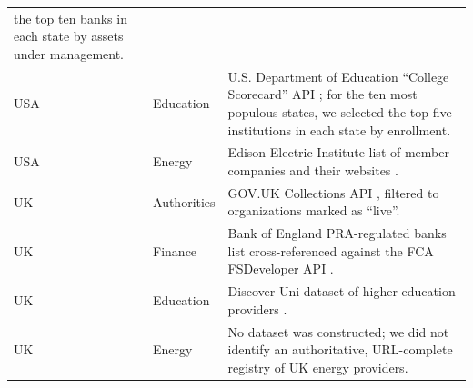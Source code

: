 \documentclass[pdflatex,sn-mathphys-num]{sn-jnl}
\newlength{\inlinecapskip}
\newenvironment{inlinecap}[1][\textwidth]
  {\par\vspace{\inlinecapskip}\noindent\begin{minipage}{#1}\centering}
  {\end{minipage}\par\vspace{\inlinecapskip}}
\numberwithin{equation}{section}
\theoremstyle{thmstyleone}
\theoremstyle{thmstyletwo}%
\theoremstyle{thmstylethree}%
\begin{document}
\begin{inlinecap}
{\begin{tabular}{llp{}}
        the top ten banks in each state by assets under management. \\
      USA & Education &
        U.S. Department of Education ``College Scorecard'' API
        \cite{us-college-scorecard-docs}; for the ten most populous states,
        we selected the top five institutions in each state by enrollment. \\
      USA & Energy &
        Edison Electric Institute list of member companies and their websites
        \cite{edison-electric-member-sites}. \\
      \addlinespace[0.6em]
      UK & Authorities &
        GOV.UK Collections API \cite{uk-gov-collections-api-docs,uk-gov-collections-api},
        filtered to organizations marked as ``live''. \\
      UK & Finance &
        Bank of England PRA-regulated banks list
        \cite{uk-pra-creditunions-list} cross-referenced against the FCA
        FSDeveloper API \cite{uk-fca-api-docs}. \\
      UK & Education &
        Discover Uni dataset of higher-education providers
        \cite{hesa_discoveruni_2024}. \\
      UK & Energy &
        No dataset was constructed; we did not identify an authoritative, URL-complete
        registry of UK energy providers. \\
      \bottomrule
    \end{tabular}%
  }
\end{inlinecap}




\end{document}
